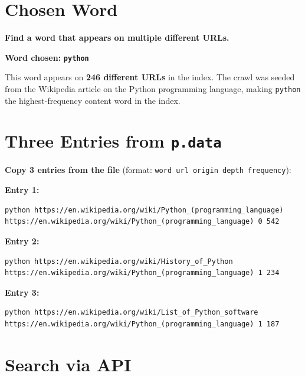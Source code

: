 \documentclass[12pt,a4paper]{article}
\newenvironment{answerbox}{%
  \begin{mdframed}[
    backgroundcolor=lightaccent,
    linecolor=accent,
    linewidth=1pt,
    innerleftmargin=10pt,
    innerrightmargin=10pt,
    innertopmargin=8pt,
    innerbottommargin=8pt,
  ]%
}{\end{mdframed}}
\begin{document}
\section{Chosen Word}

\textbf{Find a word that appears on multiple different URLs.}

\begin{answerbox}
\textbf{Word chosen:} \texttt{\textbf{python}}

\medskip
This word appears on \textbf{246 different URLs} in the index.
The crawl was seeded from the Wikipedia article on the Python programming
language, making \texttt{python} the highest-frequency content word in the index.
\end{answerbox}

\section{Three Entries from \texttt{p.data}}

\textbf{Copy 3 entries from the file} (format: \texttt{word url origin depth frequency}):

\begin{answerbox}
\textbf{Entry 1:}
\begin{lstlisting}[style=inline]
python https://en.wikipedia.org/wiki/Python_(programming_language) https://en.wikipedia.org/wiki/Python_(programming_language) 0 542
\end{lstlisting}

\textbf{Entry 2:}
\begin{lstlisting}[style=inline]
python https://en.wikipedia.org/wiki/History_of_Python https://en.wikipedia.org/wiki/Python_(programming_language) 1 234
\end{lstlisting}

\textbf{Entry 3:}
\begin{lstlisting}[style=inline]
python https://en.wikipedia.org/wiki/List_of_Python_software https://en.wikipedia.org/wiki/Python_(programming_language) 1 187
\end{lstlisting}
\end{answerbox}

\section{Search via API}
\end{document}
